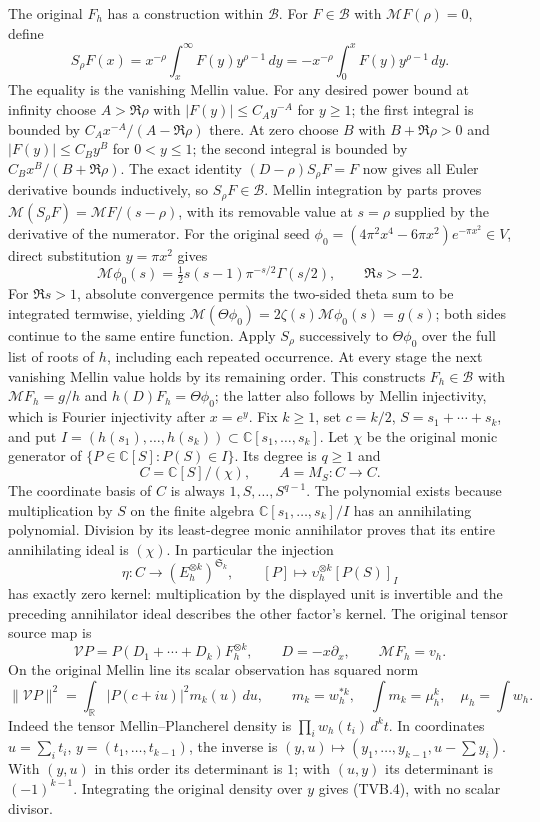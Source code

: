 \documentclass[11pt]{article}
\newcommand{\C}{\mathbb C}
\newcommand{\R}{\mathbb R}
\begin{document}
The original $F_h$ has a construction within $\mathscr B$.
For $F\in\mathscr B$ with $\mathcal MF(\rho)=0$, define
\[
 S_\rho F(x)=x^{-\rho}\int_x^\infty F(y)y^{\rho-1}\,dy
           =-x^{-\rho}\int_0^x F(y)y^{\rho-1}\,dy.
\]
The equality is the vanishing Mellin value. For any desired
power bound at infinity choose $A>\Re\rho$ with
$|F(y)|\le C_Ay^{-A}$ for $y\ge1$; the first integral is bounded
by $C_Ax^{-A}/(A-\Re\rho)$ there. At zero choose $B$ with
$B+\Re\rho>0$ and $|F(y)|\le C_By^B$ for $0<y\le1$;
the second integral is bounded by $C_Bx^B/(B+\Re\rho)$.
The exact identity $(D-\rho)S_\rho F=F$ now gives all Euler
derivative bounds inductively, so $S_\rho F\in\mathscr B$.
Mellin integration by parts proves
$\mathcal M(S_\rho F)=\mathcal MF/(s-\rho)$, with its removable
value at $s=\rho$ supplied by the derivative of the numerator.
For the original seed
$\phi_0=(4\pi^2x^4-6\pi x^2)e^{-\pi x^2}\in V$,
direct substitution $y=\pi x^2$ gives
\[
 \mathcal M\phi_0(s)=\tfrac12s(s-1)\pi^{-s/2}\Gamma(s/2),
 \qquad \Re s>-2.
\]
For $\Re s>1$, absolute convergence permits the two-sided theta
sum to be integrated termwise, yielding
$\mathcal M(\Theta\phi_0)=2\zeta(s)\mathcal M\phi_0(s)=g(s)$;
both sides continue to the same entire function. Apply $S_\rho$
successively to $\Theta\phi_0$ over the full list of roots of $h$,
including each repeated occurrence. At every stage the next
vanishing Mellin value holds by its remaining order. This constructs
$F_h\in\mathscr B$ with $\mathcal MF_h=g/h$ and
$h(D)F_h=\Theta\phi_0$; the latter also follows by Mellin
injectivity, which is Fourier injectivity after $x=e^y$.
Fix $k\ge1$, set $c=k/2$, $S=s_1+\cdots+s_k$, and put
$I=(h(s_1),\ldots,h(s_k))\subset\C[s_1,\ldots,s_k]$.
Let $\chi$ be the original monic generator of
$\{P\in\C[S]:P(S)\in I\}$. Its degree is $q\ge1$ and
\[
 C=\C[S]/(\chi),\qquad A=M_S:C\longrightarrow C.
 \tag{TVB.2}
\]
The coordinate basis of $C$ is always $1,S,\ldots,S^{q-1}$.
The polynomial exists because multiplication by $S$ on the finite
algebra $\C[s_1,\ldots,s_k]/I$ has an annihilating polynomial.
Division by its least-degree monic annihilator proves that its entire
annihilating ideal is $(\chi)$. In particular the injection
\[
 \eta:C\longrightarrow(E_h^{\otimes k})^{\mathfrak S_k},\qquad
 [P]\longmapsto\upsilon_h^{\otimes k}[P(S)]_I
 \tag{TVB.3}
\]
has exactly zero kernel: multiplication by the displayed unit is
invertible and the preceding annihilator ideal describes the other
factor's kernel. The original tensor source map is
\[
 \mathcal V P=P(D_1+\cdots+D_k)F_h^{\otimes k},\qquad
 D=-x\partial_x,\qquad \mathcal MF_h=v_h.
\]
On the original Mellin line its scalar observation has squared norm
\[
 \|\mathcal VP\|^2=\int_\R |P(c+iu)|^2m_k(u)\,du,
 \qquad m_k=w_h^{*k},\quad
 \int m_k=\mu_h^k,\quad\mu_h=\int w_h.
 \tag{TVB.4}
\]
Indeed the tensor Mellin--Plancherel density is
$\prod_iw_h(t_i)\,d^kt$. In coordinates
$u=\sum_i t_i$, $y=(t_1,\ldots,t_{k-1})$, the inverse is
$(y,u)\mapsto(y_1,\ldots,y_{k-1},u-\sum y_i)$.
With $(y,u)$ in this order its determinant is $1$; with $(u,y)$
its determinant is $(-1)^{k-1}$. Integrating the original density
over $y$ gives (TVB.4), with no scalar divisor.
\end{document}

